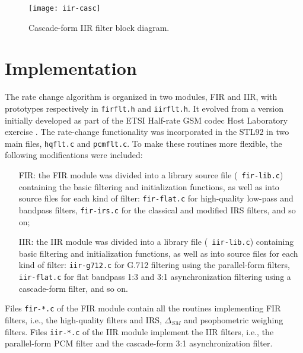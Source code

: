 \begin{figure}
  \begin{center}
    \texttt{[image: iir-casc]}
  \end{center}
  \caption{\SF Cascade-form IIR filter block diagram.
               \label{IIR-cascade-filter}}
\end{figure}


\section{Implementation}

The rate change algorithm is organized in two modules, FIR and IIR,
with prototypes respectively in {\tt firflt.h} and {\tt iirflt.h}. It
evolved from a version initially developed as part of the ETSI
Half-rate GSM codec Host Laboratory exercise \cite{SCD-ETSI}. The
rate-change functionality was incorporated in the STL92 in two main
files, {\tt hqflt.c} and {\tt pcmflt.c}.  To make these routines more
flexible, the following modifications were included:
\begin{itemize}
 \item[FIR:] the FIR module was divided into a library source file ({\tt
        fir-lib.c}) containing the basic filtering and
        initialization functions, as well as into source files for each kind of
        filter: {\tt fir-flat.c} for high-quality low-pass and bandpass
        filters, {\tt fir-irs.c} for the classical and modified IRS
        filters, and so on;
 \item[IIR:] the IIR module was divided into a library file ({\tt
        iir-lib.c}) containing basic filtering and
        initialization functions, as well as into source files for each kind of
        filter: {\tt iir-g712.c} for G.712 filtering using the
        parallel-form filters, {\tt iir-flat.c} for flat bandpass 1:3
        and 3:1 asynchronization filtering using a cascade-form
        filter, and so on.
\end{itemize}

Files {\tt fir-*.c} of the FIR module contain all the routines
implementing FIR filters, i.e., the high-quality filters and IRS,
$\Delta_{SM}$ and psophometric weighing filters. Files {\tt iir-*.c}
of the IIR module implement the IIR filters, i.e., the parallel-form PCM
filter and the cascade-form 3:1 asynchronization filter.


